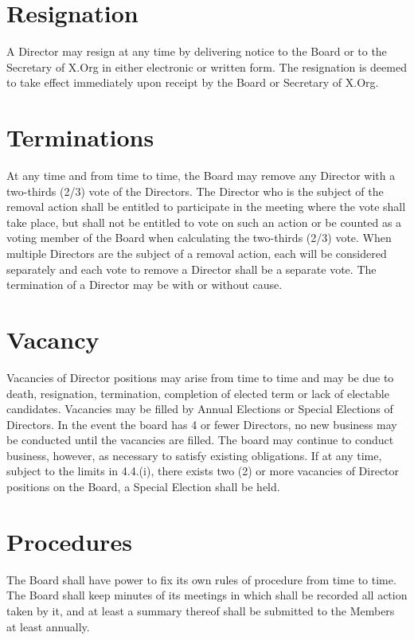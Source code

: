 \documentclass[10pt, english]{xorgdocs}
\begin{document}
\section{Resignation}
A Director may resign at any time by delivering notice to the Board or to the
Secretary of X.Org in either electronic or written form.  The resignation is
deemed to take effect immediately upon receipt by the Board or Secretary of
X.Org.

\section{Terminations}
At any time and from time to time, the Board may remove any Director with a
two-thirds (2/3) vote of the Directors.  The Director who is the subject of the
removal action shall be entitled to participate in the meeting where the vote
shall take place, but shall not be entitled to vote on such an action or be
counted as a voting member of the Board when calculating the two-thirds (2/3)
vote.  When multiple Directors are the subject of a removal action, each will be
considered separately and each vote to remove a Director shall be a separate
vote.  The termination of a Director may be with or without cause.

\section{Vacancy}
Vacancies of Director positions may arise from time to time and may be due to
death, resignation, termination, completion of elected term or lack of electable
candidates.  Vacancies may be filled by Annual Elections or Special Elections of
Directors.  In the event the board has 4 or fewer Directors, no new business may
be conducted until the vacancies are filled. The board may continue to conduct
business, however, as necessary to satisfy existing obligations. If at any time,
subject to the limits in 4.4.(i), there exists two (2) or more vacancies of
Director positions on the Board, a Special Election shall be held.

\section{Procedures}
The Board shall have power to fix its own rules of procedure from time to time.
The Board shall keep minutes of its meetings in which shall be recorded all
action taken by it, and at least a summary thereof shall be submitted to the
Members at least annually.
\end{document}
